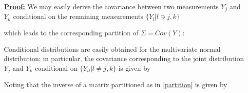 \documentclass[12pt]{article}
\theoremstyle{definition}
\begin{document}
\underline{\bf Proof:} We may easily derive the covariance between two measurements $Y_{j}$ and $Y_{k}$ conditional on the remaining measurements $\lbrace Y_{l} \vert l\ni j,k \rbrace$ %

\noindent
which leads to the corresponding partition of $\Sigma = Cov\left(Y\right)$:


Conditional distributions are easily obtained for the multivariate normal distribution; in particular, the covariance corresponding to the joint distribution $Y_{j}$ and $Y_{k}$ conditional on $\lbrace Y_{il} \vert l \ne j,k \rbrace$ is given by 

Noting that the inverse of a matrix partitioned as in \eqref{partition} is given by 
\end{document}
